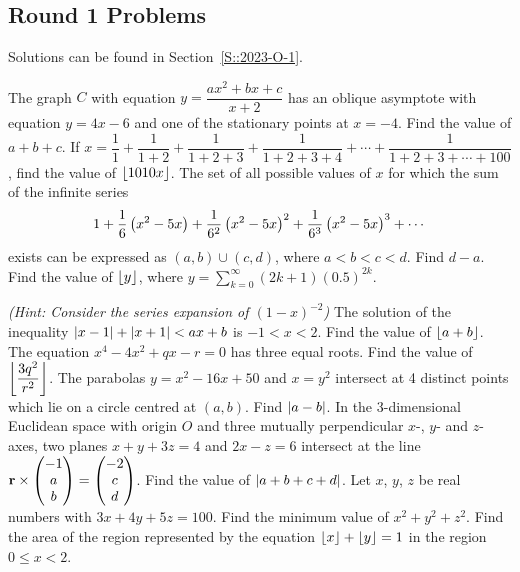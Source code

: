 \subsection{Round 1 Problems}
Solutions can be found in Section~\ref{S::2023-O-1}.

\begin{enumerate}
    \hyperrefitem[A::2023-O-1-1] The graph $C$ with equation $y = \dfrac{ax^2 + bx + c}{x+2}$ has an oblique asymptote with equation $y = 4x - 6$ and one of the stationary points at $x = -4$. Find the value of $a + b + c$.
    \hyperrefitem[A::2023-O-1-2] If $x = \dfrac{1}{1} + \dfrac{1}{1+2} + \dfrac{1}{1+2+3} + \dfrac{1}{1+2+3+4} + \cdots + \dfrac{1}{1 + 2 + 3 + \cdots + 100}$, find the value of $\left\lfloor 1010x \right\rfloor$.
    \hyperrefitem[A::2023-O-1-3] The set of all possible values of $x$ for which the sum of the infinite series \[1 + \dfrac16 \left( x^2 - 5x \right) + \dfrac1{6^2} \left( x^2 - 5x \right)^2 + \dfrac1{6^3} \left( x^2 - 5x \right)^3 + \cdots\] exists can be expressed as $(a, b) \cup (c, d)$, where $a < b < c < d$. Find $d - a$.
    \hyperrefitem[A::2023-O-1-4] Find the value of $\left\lfloor y \right\rfloor$, where $y = \displaystyle\sum_{k=0}^\infty (2k+1)(0.5)^{2k}$.

    \textit{(Hint: Consider the series expansion of $(1 - x)^{-2}$)}
    \hyperrefitem[A::2023-O-1-5] The solution of the inequality $\left\lvert x-1 \right\rvert + \left\lvert x+1 \right\rvert < ax + b$ is $-1 < x < 2$. Find the value of $\left\lfloor a + b \right\rfloor$.
    \hyperrefitem[A::2023-O-1-6] The equation $x^4 - 4x^2 + qx - r = 0$ has three equal roots. Find the value of $\left\lfloor \dfrac{3q^2}{r^2} \right\rfloor$.
    \hyperrefitem[A::2023-O-1-7] The parabolas $y = x^2 - 16x + 50$ and $x = y^2$ intersect at 4 distinct points which lie on a circle centred at $(a, b)$. Find $\left\lvert a - b \right\rvert$.
    \hyperrefitem[A::2023-O-1-8] In the 3-dimensional Euclidean space with origin $O$ and three mutually perpendicular $x$-, $y$- and $z$-axes, two planes $x + y + 3z = 4$ and $2x - z = 6$ intersect at the line $\mathbf{r} \times \begin{pmatrix} -1 \\ a \\ b \end{pmatrix} = \begin{pmatrix} -2 \\ c \\ d \end{pmatrix}$. Find the value of $\left\lvert a + b + c + d \right\rvert$.
    \hyperrefitem[A::2023-O-1-9] Let $x$, $y$, $z$ be real numbers with $3x + 4y + 5z = 100$. Find the minimum value of $x^2 + y^2 + z^2$.
    \hyperrefitem[A::2023-O-1-10] Find the area of the region represented by the equation $\left\lfloor x \right\rfloor + \left\lfloor y \right\rfloor = 1$ in the region $0 \leq x < 2$.


\end{enumerate}
